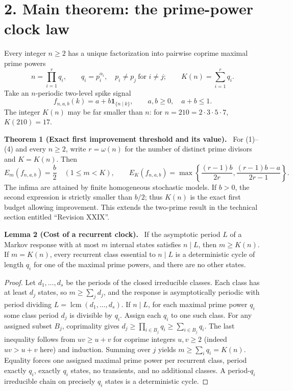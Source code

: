 \documentclass[11pt,a4paper,oneside]{book}
\newcommand{\one}{\mathbf 1}\newcommand{\ii}{\mathrm i}\newcommand{\dd}{\mathrm d}
\DeclareMathOperator{\lcm}{lcm}\DeclareMathOperator{\spanR}{span_{\mathbb R}}
\newcommand{\statement}[3]{\par\medskip\noindent\textbf{#1 #2 (#3).}\ }
\begin{document}
\section*{2. Main theorem: the prime-power clock law}
Every integer $n\ge2$ has a unique factorization into pairwise coprime maximal prime powers
\begin{equation}n=\prod_{i=1}^r q_i,\qquad q_i=p_i^{\alpha_i},\quad p_i\ne p_j\ \text{for }i\ne j;\qquad K(n)=\sum_{i=1}^r q_i.\tag{3}\end{equation}
Take an $n$-periodic two-level spike signal
\begin{equation}f_{n,a,b}(k)=a+b\one_{\{n\mid k\}},\qquad a,b\ge0,\quad a+b\le1.\tag{4}\end{equation}
The integer $K(n)$ may be far smaller than $n$: for $n=210=2\cdot3\cdot5\cdot7$, $K(210)=17$.
\statement{Theorem}{1}{Exact first improvement threshold and its value} For (1)--(4) and every $n\ge2$, write $r=\omega(n)$ for the number of distinct prime divisors and $K=K(n)$. Then
\begin{equation}E_m(f_{n,a,b})=\frac b2\quad(1\le m<K),\qquad E_K(f_{n,a,b})=\max\left\{\frac{(r-1)b}{2r},\frac{(r-1)b-a}{2r-1}\right\}.\tag{5}\end{equation}
The infima are attained by finite homogeneous stochastic models. If $b>0$, the second expression is strictly smaller than $b/2$; thus $K(n)$ is the exact first budget allowing improvement. This extends the two-prime result in the technical section entitled ``Revision XXIX''.
\statement{Lemma}{2}{Cost of a recurrent clock} If the asymptotic period $L$ of a Markov response with at most $m$ internal states satisfies $n\mid L$, then $m\ge K(n)$. If $m=K(n)$, every recurrent class essential to $n\mid L$ is a deterministic cycle of length $q_i$ for one of the maximal prime powers, and there are no other states.
\begin{proof}Let $d_1,\ldots,d_s$ be the periods of the closed irreducible classes. Each class has at least $d_j$ states, so $m\ge\sum_jd_j$, and the response is asymptotically periodic with period dividing $L=\lcm(d_1,\ldots,d_s)$. If $n\mid L$, for each maximal prime power $q_i$ some class period $d_j$ is divisible by $q_i$. Assign each $q_i$ to one such class. For any assigned subset $B_j$, coprimality gives $d_j\ge\prod_{i\in B_j}q_i\ge\sum_{i\in B_j}q_i$. The last inequality follows from $uv\ge u+v$ for coprime integers $u,v\ge2$ (indeed $uv>u+v$ here) and induction. Summing over $j$ yields $m\ge\sum_iq_i=K(n)$. Equality forces one assigned maximal prime power per recurrent class, period exactly $q_i$, exactly $q_i$ states, no transients, and no additional classes. A period-$q_i$ irreducible chain on precisely $q_i$ states is a deterministic cycle.\end{proof}
\end{document}
